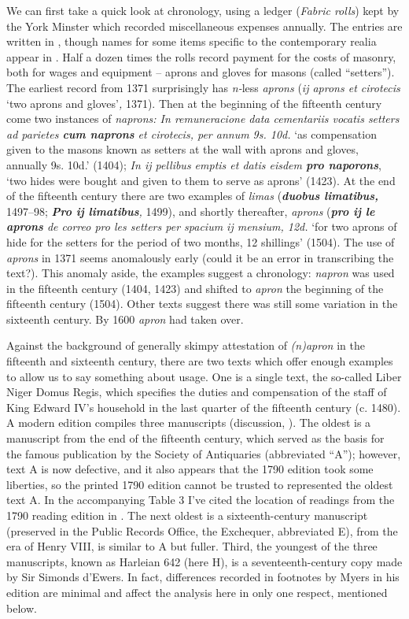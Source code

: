 \documentclass[output=paper,
modfonts
]{LSP/langsci}
\begin{document}
We can first take a quick look at chronology, using a ledger
(\emph{Fabric rolls}) kept by the York Minster which recorded
miscellaneous expenses annually. The entries are written in ,
though names for some items specific to the contemporary realia appear
in . Half a dozen times the rolls record payment for the costs of
masonry, both for wages and equipment -- aprons and gloves for masons
(called ``setters''). The earliest record from 1371 surprisingly has
\emph{n-}less \emph{aprons} (\emph{ij aprons et cirotecis} `two aprons
and gloves'\emph{,} 1371). Then at the beginning of the fifteenth
century come two instances of \emph{naprons: In remuneracione data
cementariis vocatis setters ad parietes \textbf{cum naprons} et
cirotecis, per annum 9s. 10d.} `as compensation given to the masons
known as setters at the wall with aprons and gloves, annually 9s. 10d.'
(1404); \emph{In ij pellibus emptis et datis eisdem \textbf{pro
naporons}}, `two hides were bought and given to them to serve as aprons'
(1423). At the end of the fifteenth century there are two examples of
 \emph{limas} (\emph{\textbf{duobus limatibus,}} 1497--98;
\emph{\textbf{Pro ij limatibus},} 1499), and shortly thereafter,
\emph{aprons} (\emph{\textbf{pro ij le aprons} de correo pro les setters
per spacium ij mensium, 12d.} `for two aprons of hide for the setters
for the period of two months, 12 shillings' (1504). The use of
\emph{aprons} in 1371 seems anomalously early (could it be an error in
transcribing the text?). This anomaly aside, the examples suggest a
chronology: \emph{napron} was used in the fifteenth century (1404, 1423)
and shifted to \emph{apron} the beginning of the fifteenth century
(1504). Other texts suggest there was still some variation in the
sixteenth century. By 1600 \emph{apron} had taken over.

Against the background of generally skimpy attestation of
\emph{(n)apron} in the fifteenth and sixteenth century, there are two
texts which offer enough examples to allow us to say something about
usage. One is a single text, the so-called Liber Niger Domus Regis,
which specifies the duties and compensation of the staff of King Edward
IV's household in the last quarter of the fifteenth century (c. 1480). A
modern edition compiles three manuscripts (discussion, \citealt[51--60]{myers}). The oldest is a manuscript from the end of the fifteenth
century, which served as the basis for the famous \citeyear{XEDWARD} publication by
the Society of Antiquaries (abbreviated ``A''); however, text A is now
defective, and it also appears that the 1790 edition took some
liberties, so the printed 1790 edition cannot be trusted to represented
the oldest text A. In the accompanying Table 3 I've cited the location
of readings from the 1790 reading edition in \textbar{}\textbar{}. The
next oldest is a sixteenth-century manuscript (preserved in the Public
Records Office, the Exchequer, abbreviated E), from the era of Henry
VIII, is similar to A but fuller. Third, the youngest of the three
manuscripts, known as Harleian 642 (here H), is a seventeenth-century
copy made by Sir Simonds d'Ewers. In fact, differences recorded in
footnotes by Myers in his edition are minimal and affect the analysis
here in only one respect, mentioned below.
\end{document}
